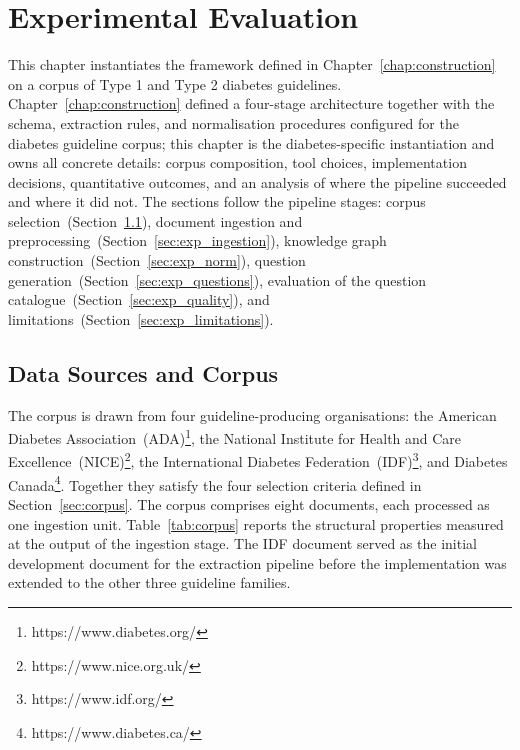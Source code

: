 \chapter{Experimental Evaluation}
\label{chap:evaluation}

This chapter instantiates the framework defined in
Chapter~\ref{chap:construction} on a corpus of Type 1 and Type 2 diabetes guidelines.
Chapter~\ref{chap:construction} defined a four-stage architecture together with
the schema, extraction rules, and normalisation procedures configured for the
diabetes guideline corpus;
this chapter is the diabetes-specific instantiation and owns all concrete
details: corpus composition, tool choices, implementation decisions,
quantitative outcomes, and an analysis of where the pipeline succeeded and
where it did not. The sections follow the pipeline stages: corpus
selection~(Section~\ref{sec:exp_data}), document ingestion and
preprocessing~(Section~\ref{sec:exp_ingestion}), knowledge graph
construction~(Section~\ref{sec:exp_norm}), question
generation~(Section~\ref{sec:exp_questions}), evaluation of the question
catalogue~(Section~\ref{sec:exp_quality}), and
limitations~(Section~\ref{sec:exp_limitations}).

\section{Data Sources and Corpus}
\label{sec:exp_data}

The corpus is drawn from four guideline-producing organisations: the
American Diabetes Association~(ADA)\footnote{https://www.diabetes.org/}, the National Institute for Health and
Care Excellence~(NICE)\footnote{https://www.nice.org.uk/}, the International Diabetes Federation~(IDF)\footnote{https://www.idf.org/}, and
Diabetes Canada\footnote{https://www.diabetes.ca/}. Together they satisfy the four selection criteria defined
in Section~\ref{sec:corpus}. The corpus comprises eight documents, each
processed as one ingestion unit. Table~\ref{tab:corpus} reports the
structural properties measured at the output of the ingestion stage.
The IDF document served as the initial development document for the
extraction pipeline before the implementation was extended to the other
three guideline families.

